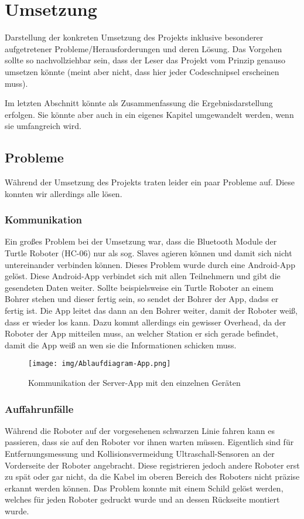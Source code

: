 \chapter{Umsetzung}

Darstellung der konkreten Umsetzung des Projekts inklusive besonderer aufgetretener Probleme/Herausforderungen und deren Lösung. Das Vorgehen sollte so nachvollziehbar sein, dass der Leser das Projekt vom Prinzip genauso umsetzen könnte (meint aber nicht, dass hier jeder Codeschnipsel erscheinen muss). 

Im letzten Abschnitt könnte als Zusammenfassung die Ergebnisdarstellung erfolgen. Sie könnte aber auch in ein eigenes Kapitel umgewandelt werden, wenn sie umfangreich wird.



\section{Probleme}
Während der Umsetzung des Projekts traten leider ein paar Probleme auf. Diese konnten wir allerdings alle lösen.
\subsection{Kommunikation}
Ein großes Problem bei der Umsetzung war, dass die Bluetooth Module der Turtle Roboter (HC-06) nur als sog. Slaves agieren können und damit sich nicht untereinander verbinden können. Dieses Problem wurde durch eine Android-App gelöst.
Diese Android-App verbindet sich mit allen Teilnehmern und gibt die gesendeten Daten weiter. Sollte beispielsweise ein Turtle Roboter an einem Bohrer stehen und dieser fertig sein, so sendet der Bohrer der App, dadss er fertig ist. Die App leitet das dann an den Bohrer weiter, damit der Roboter weiß, dass er wieder los kann.
Dazu kommt allerdings ein gewisser Overhead, da der Roboter der App mitteilen muss, an welcher Station er sich gerade befindet, damit die App weiß an wen sie die Informationen schicken muss.
\begin{figure}[h]
\begin{center}
\texttt{[image: img/Ablaufdiagram-App.png]}
\caption{Kommunikation der Server-App mit den einzelnen Geräten}
\end{center}
\end{figure}

\subsection{Auffahrunfälle}
Während die Roboter auf der vorgesehenen schwarzen Linie fahren kann es passieren, dass sie auf den Roboter vor ihnen warten müssen. Eigentlich sind für Entfernungsmessung und Kollisionsvermeidung Ultraschall-Sensoren an der Vorderseite der Roboter angebracht. Diese registrieren jedoch andere Roboter erst zu spät oder gar nicht, da die Kabel im oberen Bereich des Roboters nicht präzise erkannt werden können. 
Das Problem konnte mit einem Schild gelöst werden, welches für jeden Roboter gedruckt wurde und an dessen Rückseite montiert wurde.